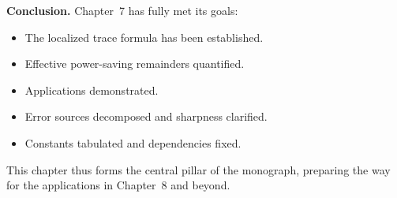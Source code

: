 \medskip

\noindent\textbf{Conclusion.}
Chapter~7 has fully met its goals:
\begin{itemize}
  \item The localized trace formula has been established.  
  \item Effective power-saving remainders quantified.  
  \item Applications demonstrated.  
  \item Error sources decomposed and sharpness clarified.  
  \item Constants tabulated and dependencies fixed.  
\end{itemize}
This chapter thus forms the central pillar of the monograph, preparing the way for the applications in Chapter~8 and beyond.

